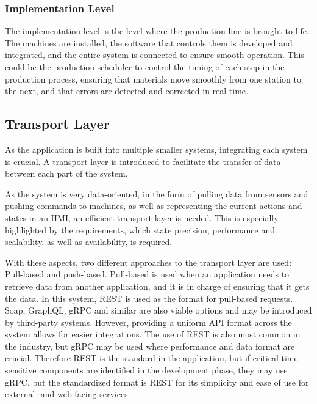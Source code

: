 \subsubsection{Implementation Level}
The implementation level is the level where the production line is brought to life. The machines are installed, the software that controls them is developed and integrated, and the entire system is connected to ensure smooth operation. This could be the production scheduler to control the timing of each step in the production process, ensuring that materials move smoothly from one station to the next, and that errors are detected and corrected in real time.





\subsection{Transport Layer} %


As the application is built into multiple smaller systems, integrating each system is crucial. A transport layer is introduced to facilitate the transfer of data between each part of the system. 

As the system is very data-oriented, in the form of pulling data from sensors and pushing commands to machines, as well as representing the current actions and states in an HMI, an efficient transport layer is needed. This is especially highlighted by the requirements, which state precision, performance and scalability, as well as availability, is required.

With these aspects, two different approaches to the transport layer are used: Pull-based and push-based.
Pull-based is used when an application needs to retrieve data from another application, and it is in charge of ensuring that it gets the data.
In this system, REST is used as the format for pull-based requests. Soap, GraphQL, gRPC and similar are also viable options and may be introduced by third-party systems. However, providing a uniform API format across the system allows for easier integrations. The use of REST is also most common in the industry, but gRPC may be used where performance and data format are crucial. Therefore REST is the standard in the application, but if critical time-sensitive components are identified in the development phase, they may use gRPC, but the standardized format is REST for its simplicity and ease of use for external- and web-facing services.

